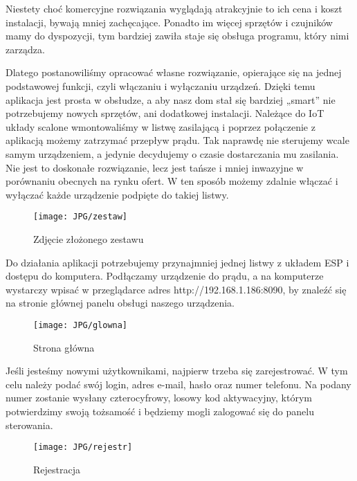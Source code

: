 \documentclass{xmgr}
\begin{document}
\newpage
Niestety choć komercyjne rozwiązania wyglądają atrakcyjnie to ich cena i koszt instalacji, bywają mniej zachęcające. Ponadto im więcej sprzętów i czujników mamy do dyspozycji, tym bardziej zawiła staje się obsługa programu, który nimi zarządza. 

Dlatego postanowiliśmy opracować własne rozwiązanie, opierające się na jednej podstawowej funkcji, czyli włączaniu i wyłączaniu urządzeń. Dzięki temu aplikacja jest prosta w obsłudze, a aby nasz dom stał się bardziej „smart” nie potrzebujemy nowych sprzętów, ani dodatkowej instalacji. Należące do IoT układy scalone wmontowaliśmy w listwę zasilającą i poprzez połączenie z aplikacją możemy zatrzymać przepływ prądu. Tak naprawdę nie sterujemy wcale samym urządzeniem, a jedynie decydujemy o czasie dostarczania mu zasilania. Nie jest to doskonałe rozwiązanie, lecz jest tańsze i mniej inwazyjne w porównaniu obecnych na rynku ofert. W ten sposób możemy zdalnie włączać i wyłączać każde urządzenie podpięte do takiej listwy.  

\hspace{2cm}
\begin{figure}[h]
\begin{center}
\texttt{[image: JPG/zestaw]}
\caption{Zdjęcie złożonego zestawu}
\end{center}
\end{figure}

\newpage

Do działania aplikacji potrzebujemy przynajmniej jednej listwy z układem ESP  i dostępu do komputera. Podłączamy urządzenie do prądu, a na komputerze wystarczy wpisać w przeglądarce adres  http://192.168.1.186:8090, by znaleźć się na stronie głównej panelu obsługi naszego urządzenia. 

\hspace{2cm}
\begin{figure}[h]
\begin{center}
\texttt{[image: JPG/glowna]}
\caption{Strona główna}
\end{center}
\end{figure}

Jeśli jesteśmy nowymi użytkownikami, najpierw trzeba się zarejestrować. W tym celu należy podać swój login, adres e-mail, hasło oraz numer telefonu. Na podany numer zostanie wysłany czterocyfrowy, losowy kod aktywacyjny, którym potwierdzimy swoją tożsamość i będziemy mogli zalogować się do panelu sterowania.

\begin{figure}
\begin{center}
\texttt{[image: JPG/rejestr]}
\caption{Rejestracja}
\end{center}
\end{figure}
\end{document}

